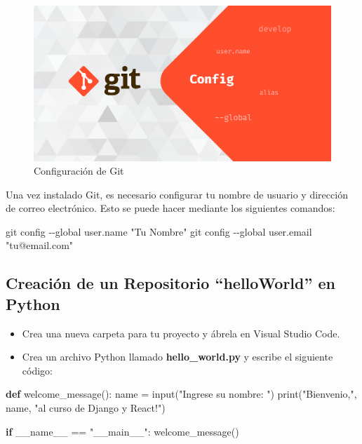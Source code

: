 \documentclass[
  a4paper,
  DIV=11,
  numbers=noendperiod,
  onepage,
  openany]{scrreprt}
\newenvironment{Shaded}{\begin{snugshade}}{\end{snugshade}}
\newcommand{\AttributeTok}[1]{\textcolor[rgb]{0.40,0.45,0.13}{#1}}
\newcommand{\BuiltInTok}[1]{\textcolor[rgb]{0.00,0.23,0.31}{#1}}
\newcommand{\ControlFlowTok}[1]{\textcolor[rgb]{0.00,0.23,0.31}{\textbf{#1}}}
\newcommand{\FunctionTok}[1]{\textcolor[rgb]{0.28,0.35,0.67}{#1}}
\newcommand{\KeywordTok}[1]{\textcolor[rgb]{0.00,0.23,0.31}{\textbf{#1}}}
\newcommand{\NormalTok}[1]{\textcolor[rgb]{0.00,0.23,0.31}{#1}}
\newcommand{\OperatorTok}[1]{\textcolor[rgb]{0.37,0.37,0.37}{#1}}
\newcommand{\StringTok}[1]{\textcolor[rgb]{0.13,0.47,0.30}{#1}}
\newcommand{\VariableTok}[1]{\textcolor[rgb]{0.07,0.07,0.07}{#1}}
\providecommand{\tightlist}{%
  \setlength{\itemsep}{0pt}\setlength{\parskip}{0pt}}\usepackage{longtable,booktabs,array}
\begin{document}
\begin{figure}[H]

{\centering \includegraphics[width=6.25in,height=\textheight,keepaspectratio]{unidades/unidad0/../../images/git_config.png}

}

\caption{Configuración de Git}

\end{figure}%

Una vez instalado Git, es necesario configurar tu nombre de usuario y
dirección de correo electrónico. Esto se puede hacer mediante los
siguientes comandos:

\begin{Shaded}
\begin{Highlighting}[]
\FunctionTok{git}\NormalTok{ config }\AttributeTok{{-}{-}global}\NormalTok{ user.name }\StringTok{"Tu Nombre"}
\FunctionTok{git}\NormalTok{ config }\AttributeTok{{-}{-}global}\NormalTok{ user.email }\StringTok{"tu@email.com"}
\end{Highlighting}
\end{Shaded}

\subsection{Creación de un Repositorio ``helloWorld'' en Python
🐍}\label{creaciuxf3n-de-un-repositorio-helloworld-en-python}

\begin{itemize}
\tightlist
\item
  Crea una nueva carpeta para tu proyecto y ábrela en Visual Studio
  Code.
\item
  Crea un archivo Python llamado \textbf{hello\_world.py} y escribe el
  siguiente código:
\end{itemize}

\begin{Shaded}
\begin{Highlighting}[]
\KeywordTok{def}\NormalTok{ welcome\_message():}
\NormalTok{    name }\OperatorTok{=} \BuiltInTok{input}\NormalTok{(}\StringTok{"Ingrese su nombre: "}\NormalTok{)}
    \BuiltInTok{print}\NormalTok{(}\StringTok{"Bienvenio,"}\NormalTok{, name, }\StringTok{"al curso de Django y React!"}\NormalTok{)}

\ControlFlowTok{if} \VariableTok{\_\_name\_\_} \OperatorTok{==} \StringTok{"\_\_main\_\_"}\NormalTok{:}
\NormalTok{    welcome\_message()}
\end{Highlighting}
\end{Shaded}
\end{document}
